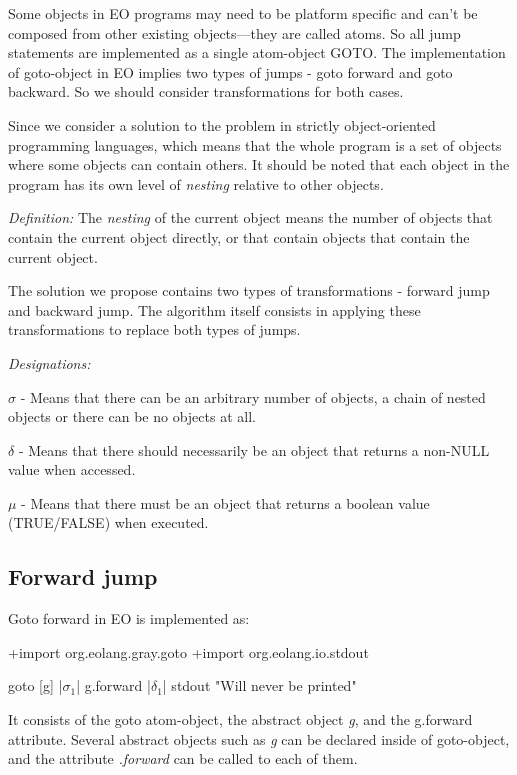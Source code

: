 \documentclass[sigplan,review,11pt,nonacm,natbib=false]{acmart}
\begin{document}
Some objects in EO programs may need to be platform specific and can’t be composed from other existing objects—they are called atoms. 
So all jump statements are implemented as a
single atom-object GOTO. The implementation of goto-object in EO implies two types of jumps - goto forward and goto backward. So we should consider transformations for both cases.

Since we consider a solution to the problem in strictly object-oriented programming languages, which means that the whole program is a set of objects where some objects can contain others.
It should be noted that each object in the program has its own level of \emph{nesting} relative to other objects.

\emph{Definition:} The \emph{nesting} of the current object means the number of objects that contain the current object directly, or that contain objects that contain the current object.

The solution we propose contains two types of transformations - forward jump and backward jump.
The algorithm itself consists in applying these transformations to replace both types of jumps.

\emph{Designations:}

$\sigma$ - Means that there can be an arbitrary number of objects, a chain of nested objects or there can be no objects at all.

$\delta$ - Means that there should necessarily be an object that returns a non-NULL value when accessed.

$\mu$ - Means that there must be an object that returns a boolean value (TRUE/FALSE) when executed.

\newcommand\sgm[1]{$\sigma_#1$}
\newcommand\dlt[1]{$\delta_#1$}
\newcommand\m[1]{$\mu_#1$}


\subsection{Forward jump}
Goto forward in EO is implemented as:

\begin{ffcode}
+import org.eolang.gray.goto
+import org.eolang.io.stdout

goto
  [g]
    |\sgm{1}|
      g.forward |\dlt{1}|
      stdout "Will never be printed"
\end{ffcode}

It consists of the goto atom-object, the abstract object \emph{g}, and the g.forward attribute. Several abstract objects such as \emph{g} can be declared inside of goto-object, and the attribute \emph{.forward} can be called to each of them.
\end{document}
